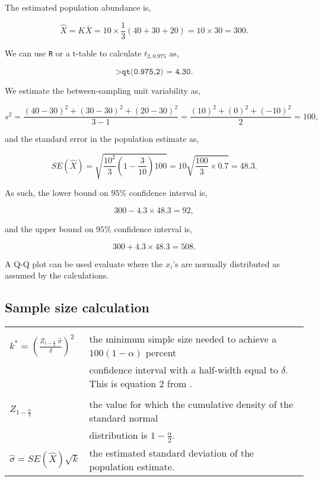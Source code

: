 \documentclass[11pt, oneside]{article}   	%
\begin{document}
The estimated population abundance is,

\[\hat{X} = K \bar{X} = 10 \times \frac{1}{3}(40 + 30 + 20) = 10 \times 30 = 300. \]

We can use \texttt{R} or a t-table to calculate $t_{2, 0.975}$ as,

\[\texttt{>qt(0.975,2) = 4.30}.\]

We estimate the between-sampling unit variability as,

\[s^2 = \frac{(40-30)^2 + (30-30)^2 + (20 - 30)^2}{3-1} = \frac{(10)^2 + (0)^2 + (-10)^2}{2}=100,\]

and the standard error in the population estimate as,

\[SE(\hat{X}) = \sqrt{\frac{10^2}{3}\left(1-\frac{3}{10}\right)100} = 10\sqrt{\frac{100}{3}\times 0.7}=48.3.\]

As such, the lower bound on $95\%$ confidence interval is,

\[300 - 4.3 \times 48.3 = 92,\]

and the upper bound on $95\%$ confidence interval is,

\[300 + 4.3 \times 48.3 = 508.\]

A Q-Q plot can be used evaluate where the $x_i$'s are normally distributed as assumed by the calculations.

\subsection*{Sample size calculation}
\begin{table}[htp!]
\begin{center}
\begin{tabular}{|ll|}
\hline
& \\
$k^*= \left( \frac{Z_{1-\frac{\alpha}{2}} \ \hat{\sigma}}{\delta} \right)^2$ & the minimum simple size needed to achieve a $100(1-\alpha)$ percent \\ 
&  confidence interval with a half-width equal to $\delta$. This is equation 2 from \cite{Greg}.  \\
& \\
$Z_{1-\frac{\alpha}{2}}$ & the value for which the cumulative density of the standard normal  \\
& distribution is $1-\frac{\alpha}{2}$.\\
$\hat{\sigma} = SE(\hat{X})\sqrt{k}$ & the estimated standard deviation of the population estimate. \\ \hline
\end{tabular}
\end{center}
\label{default}
\end{table}
\FloatBarrier
\end{document}
